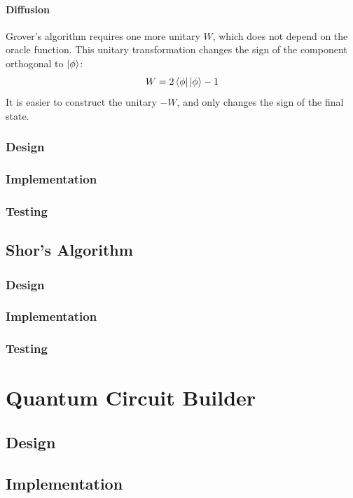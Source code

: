 \documentclass[a4paper,11pt, titlepage, twoside]{article}
\begin{document}
\paragraph{Diffusion}
Grover's algorithm requires one more unitary $W$, which does not depend on the oracle function. This unitary transformation changes the sign of the component orthogonal to $\ket{\phi}$:
$$W = 2\bra{\phi}\ket{\phi} - 1$$
It is easier to construct the unitary $-W$, and only changes the sign of the final state.



\subsubsection{Design}

\subsubsection{Implementation}

\subsubsection{Testing}


\subsection{Shor's Algorithm}
\subsubsection{Design}

\subsubsection{Implementation}

\subsubsection{Testing}

\section{Quantum Circuit Builder}
\subsection{Design}

\subsection{Implementation}
\end{document}
